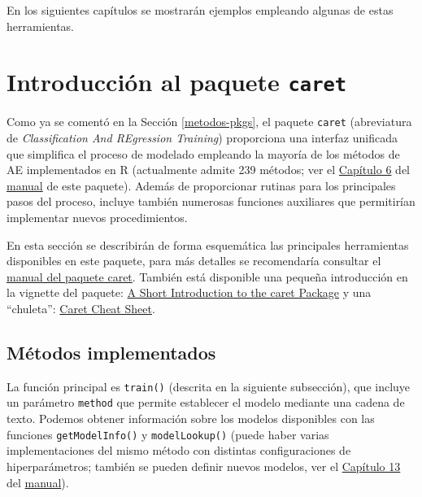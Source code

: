 \documentclass[
]{book}
\theoremstyle{break}
\theoremstyle{definition}
\theoremstyle{definition}
\theoremstyle{definition}
\theoremstyle{definition}
\theoremstyle{remark}
\begin{document}
En los siguientes capítulos se mostrarán ejemplos empleando algunas de estas herramientas.

\hypertarget{caret}{%
\section{\texorpdfstring{Introducción al paquete \texttt{caret}}{Introducción al paquete caret}}\label{caret}}

Como ya se comentó en la Sección \ref{metodos-pkgs}, el paquete \texttt{caret} (abreviatura de \emph{Classification And REgression Training}) proporciona una interfaz unificada que simplifica el proceso de modelado empleando la mayoría de los métodos de AE implementados en R (actualmente admite 239 métodos; ver el \href{https://topepo.github.io/caret/available-models.html}{Capítulo 6} del \href{https://topepo.github.io/caret}{manual} de este paquete).
Además de proporcionar rutinas para los principales pasos del proceso, incluye también numerosas funciones auxiliares que permitirían implementar nuevos procedimientos.

En esta sección se describirán de forma esquemática las principales herramientas disponibles en este paquete, para más detalles se recomendaría consultar el \href{https://topepo.github.io/caret}{manual del paquete caret}.
También está disponible una pequeña introducción en la vignette del paquete: \href{https://cran.r-project.org/web/packages/caret/vignettes/caret.html}{A Short Introduction to the caret Package} y una ``chuleta'': \href{https://raw.githubusercontent.com/rstudio/cheatsheets/master/caret.pdf}{Caret Cheat Sheet}.

\hypertarget{muxe9todos-implementados}{%
\subsection{Métodos implementados}\label{muxe9todos-implementados}}

La función principal es \texttt{train()} (descrita en la siguiente subsección), que incluye un parámetro \texttt{method} que permite establecer el modelo mediante una cadena de texto.
Podemos obtener información sobre los modelos disponibles con las funciones \texttt{getModelInfo()} y \texttt{modelLookup()} (puede haber varias implementaciones del mismo método con distintas configuraciones de hiperparámetros; también se pueden definir nuevos modelos, ver el \href{https://topepo.github.io/caret/using-your-own-model-in-train.html}{Capítulo 13} del \href{https://topepo.github.io/caret}{manual}).
\end{document}
